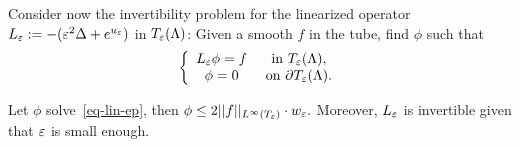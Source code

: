 Consider now the invertibility problem for the linearized operator
$L_\varepsilon:=-(\varepsilon^2 \Delta + e^{u_\varepsilon})$ in $T_\varepsilon(\Lambda)$: Given a smooth $f$ in
the tube, find $\phi$ such that
\begin{equation}
    \label{eq-lin-ep}
    \left\{
        \begin{array}{cc}
            L_\varepsilon\phi = f & \mbox{ in }T_\varepsilon(\Lambda),\\
            \phi = 0& \mbox{ on } \partial T_\varepsilon(\Lambda).
        \end{array}
    \right.
\end{equation}

\begin{lemma}\label{lem-phi}
    Let $\phi$ solve~\ref{eq-lin-ep}, then
    $\phi\leq 2 ||f||_{L^\infty(T_\varepsilon)}\cdot w_\varepsilon. $
    Moreover, $L_\varepsilon$ is invertible given that $\varepsilon$ is small enough.
\end{lemma}

